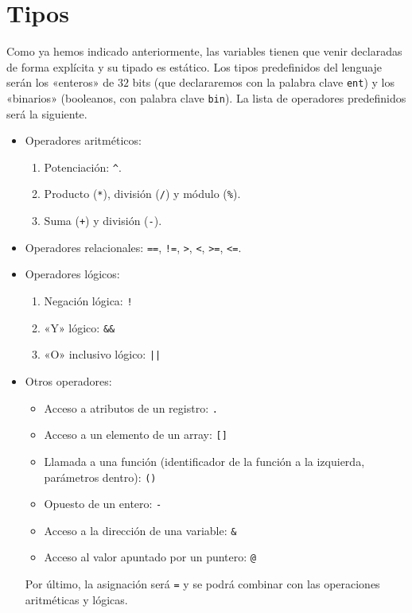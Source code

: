 \section*{Tipos}
Como ya hemos indicado anteriormente, las variables tienen que venir declaradas
de forma explícita y su tipado es estático. Los tipos predefinidos del lenguaje
serán los «enteros» de $32$ bits (que declararemos con la palabra clave
\lstinline{ent}) y los «binarios» (booleanos, con palabra clave
\lstinline{bin}). La lista de operadores predefinidos será la siguiente.
\begin{itemize}
\item Operadores aritméticos:
    \begin{enumerate}
        \item Potenciación: \lstinline{^}.
        \item Producto (\lstinline{*}), división (\lstinline{/}) y módulo (\lstinline{%}).
        \item Suma (\lstinline{+}) y división (\lstinline{-}).
    \end{enumerate}
\item Operadores relacionales: \lstinline{==}, \lstinline{!=}, \lstinline{>}, \lstinline{<},
    \lstinline{>=}, \lstinline{<=}.

\item Operadores lógicos:
\begin{enumerate}
    \item Negación lógica: \lstinline{!}
    \item «Y» lógico: \lstinline{&&}
    \item «O» inclusivo lógico: \lstinline{||}
\end{enumerate}

\item Otros operadores:
\begin{itemize}
    \item Acceso a atributos de un registro: \lstinline{.}
    \item Acceso a un elemento de un array: \lstinline{[]}
    \item Llamada a una función (identificador de la función a la izquierda,
        parámetros dentro): \lstinline{()}
    \item Opuesto de un entero: \lstinline{-}
    \item Acceso a la dirección de una variable: \lstinline{&}
    \item Acceso al valor apuntado por un puntero: \lstinline{@}
\end{itemize}
Por último, la asignación será \lstinline{=} y se podrá combinar con las
operaciones aritméticas y lógicas.
\end{itemize}
